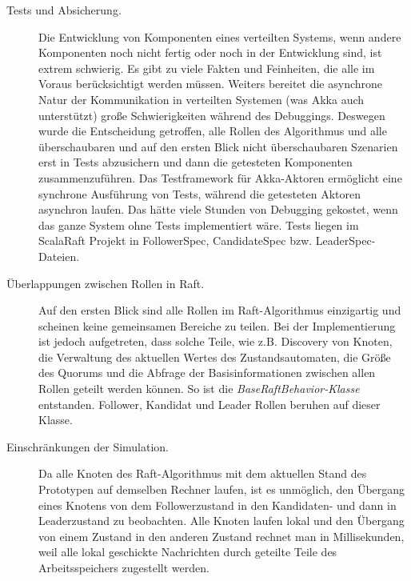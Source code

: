 \begin{description} 
	\item[Tests und Absicherung.] Die Entwicklung von Komponenten eines verteilten Systems, wenn andere Komponenten noch nicht fertig oder noch in der Entwicklung sind, ist extrem schwierig. Es gibt zu viele Fakten und Feinheiten, die alle im Voraus berücksichtigt werden müssen. Weiters bereitet die asynchrone Natur der Kommunikation in verteilten Systemen (was Akka auch unterstützt) große Schwierigkeiten während des Debuggings. Deswegen wurde die Entscheidung getroffen, alle Rollen des Algorithmus und alle überschaubaren und auf den ersten Blick nicht überschaubaren Szenarien erst in Tests abzusichern und dann die getesteten Komponenten zusammenzuführen. Das Testframework für Akka-Aktoren ermöglicht eine synchrone Ausführung von Tests, während die getesteten Aktoren asynchron laufen. Das hätte viele Stunden von Debugging gekostet, wenn das ganze System ohne Tests implementiert wäre. Tests liegen im ScalaRaft Projekt in FollowerSpec, CandidateSpec bzw. LeaderSpec-Dateien.
	
	\item[Überlappungen zwischen Rollen in Raft.] Auf den ersten Blick sind alle Rollen im Raft-Algorithmus einzigartig und scheinen keine gemeinsamen Bereiche zu teilen. Bei der Implementierung ist jedoch aufgetreten, dass solche Teile, wie z.B. Discovery von Knoten, die Verwaltung des aktuellen Wertes des Zustandsautomaten, die Größe des Quorums und die Abfrage der Basisinformationen zwischen allen Rollen geteilt werden können. So ist die \textit{BaseRaftBehavior-Klasse} entstanden. Follower, Kandidat und Leader Rollen beruhen auf dieser Klasse.
	
	\item[Einschränkungen der Simulation.] Da alle Knoten des Raft-Algorithmus mit dem aktuellen Stand des Prototypen auf demselben Rechner laufen, ist es unmöglich, den Übergang eines Knotens von dem Followerzustand in den Kandidaten- und dann in Leaderzustand zu beobachten. Alle Knoten laufen lokal und den Übergang von einem Zustand in den anderen Zustand rechnet man in Millisekunden, weil alle lokal geschickte Nachrichten durch geteilte Teile des Arbeitsspeichers zugestellt werden.
	

\end{description}
